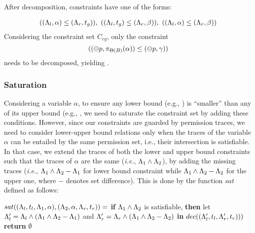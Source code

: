 {{{After decomposition, constraints have one of the forms:

\begin{align*}
((\Lambda_l,\alpha)\leq(\Lambda_r,t_g)), ~((\Lambda_l,t_g)\leq(\Lambda_r,\beta)), ~((\Lambda_l,\alpha)\leq(\Lambda_r,\beta))
\end{align*}
Considering the constraint set $C_{eg}$, only the constraint
\begin{equation*}
((\ominus p,\pi_{{\Theta(B)}}({\alpha}))\leq(\ominus p,\gamma))
\end{equation*}
needs to be decomposed, yielding .


\subsubsection{\textbf{Saturation}}
Considering a variable $\alpha$, to ensure any lower bound (e.g., ) is ``smaller'' than any of its upper bound (e.g., , we need to saturate the constraint set by adding these conditions.
However, since our constraints are guarded by permission traces, we need to consider lower-upper bound relations only when the traces of the variable $\alpha$ can be entailed by the same permission set, i.e., their intersection is satisfiable. \iffalse (i.e., $\issatisfied{\trace_1 \land \trace_2} $)\fi In that case, we extend the traces of both the lower and upper bound constraints such that the traces of $\alpha$ are the same (\emph{i.e.}, $\Lambda_1 \land \Lambda_2$), by adding the missing traces (\emph{i.e.}, $\Lambda_1 \land \Lambda_2 - \Lambda_1$ for lower bound constraint while $\Lambda_1 \land \Lambda_2 - \Lambda_2$ for the upper one, where $-$ denotes set difference).
This is done by the function $sat$ defined as follows:

\begin{algorithmic}
\STATE $sat(({\Lambda_l},{t_l},{\Lambda_1},{\alpha}),({\Lambda_2},{\alpha},{\Lambda_r},{t_r}))=$
\STATE \quad \textbf{if} $\Lambda_1 \land \Lambda_2$ is satisfiable,
\textbf{then} let $\Lambda'_l = \Lambda_l\land (\Lambda_1 \land \Lambda_2-\Lambda_1)$ and $\Lambda'_r=\Lambda_r\land (\Lambda_1 \land \Lambda_2-\Lambda_2)$ \textbf{in} $dec(({\Lambda'_l },{t_l},{ \Lambda'_r},{t_r})))$
\STATE  \quad \textbf{return} $\emptyset$
\end{algorithmic}



}}}
